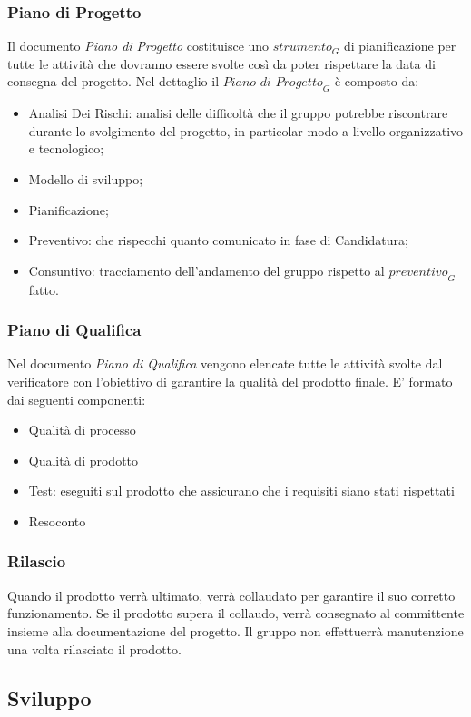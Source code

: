 \subsubsection{Piano di Progetto}
Il documento \textit{Piano di Progetto} costituisce uno $\textit{strumento}_G$ di pianificazione per tutte le attività che dovranno essere svolte così da poter rispettare la data di consegna del progetto.
Nel dettaglio il $\textit{Piano di Progetto}_G$ è composto da:
\begin{itemize}
    \item Analisi Dei Rischi: analisi delle difficoltà che il gruppo potrebbe riscontrare durante lo svolgimento del progetto, in particolar modo a livello organizzativo e tecnologico;
    \item Modello di sviluppo;
    \item Pianificazione;
    \item Preventivo: che rispecchi quanto comunicato in fase di Candidatura;
    \item Consuntivo: tracciamento dell'andamento del gruppo rispetto al $\textit{preventivo}_G$ fatto.
\end{itemize}
\subsubsection{Piano di Qualifica}
Nel documento \textit{Piano di Qualifica} vengono elencate tutte le attività svolte dal verificatore con l'obiettivo di garantire la qualità del prodotto finale.
E' formato dai seguenti componenti:
\begin{itemize}
    \item Qualità di processo
    \item Qualità di prodotto
    \item Test: eseguiti sul prodotto che assicurano che i requisiti siano stati rispettati
    \item Resoconto
\end{itemize}
\subsubsection{Rilascio}
Quando il prodotto verrà ultimato, verrà collaudato per garantire il suo corretto funzionamento. Se il prodotto supera il collaudo, verrà consegnato al committente insieme alla documentazione del progetto. 
Il gruppo non effettuerrà manutenzione una volta rilasciato il prodotto.

\subsection{Sviluppo}
